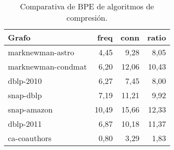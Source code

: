 \begin{table}
	\caption{Comparativa de BPE de algoritmos de compresión.}
	\label{table:BPEcomp}
	\centering
	\begin{tabular}{l|r|r|r}
		\toprule
		Grafo & freq & conn & ratio\\
		\midrule
		marknewman-astro & 4,45 & 9,28 & 8,05 \\
		marknewman-condmat & 6,20 & 12,06 & 10,43 \\
		dblp-2010 & 6,27 & 7,45 & 8,00 \\
		snap-dblp & 7,19 & 11,21 & 9,92 \\
         snap-amazon & 10,49 & 15,66 & 12,33 \\
         dblp-2011 & 6,87 & 10,18 & 11,37 \\
         ca-coauthors & 0,80 & 3,29 & 1,83 \\
         \bottomrule
	\end{tabular}
\end{table}
